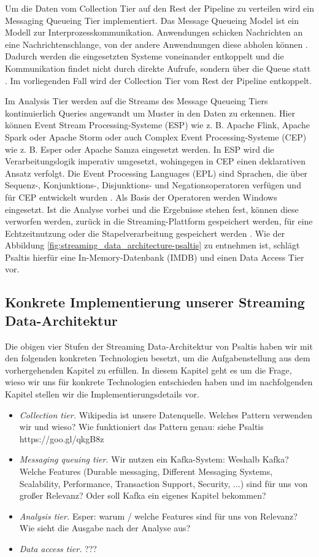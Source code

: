 Um die Daten vom Collection Tier auf den Rest der Pipeline zu verteilen wird ein Messaging Queueing Tier implementiert.
Das Message Queueing Model ist ein Modell zur Interprozesskommunikation. Anwendungen schicken
Nachrichten an eine Nachrichtenschlange, von der andere Anwendnungen diese abholen können \cite{gray2003interprocess}.
Dadurch werden die eingesetzten Systeme voneinander entkoppelt und die Kommunikation findet nicht durch direkte Aufrufe,
sondern über die Queue statt \cite{psaltis2017streaming}. Im vorliegenden Fall wird der Collection Tier vom Rest der Pipeline entkoppelt.

Im Analysis Tier werden auf die Streams des Message Queueing Tiers kontinuierlich Queries angewandt um Muster in den Daten zu erkennen.
Hier können Event Stream Processing-Systeme (ESP) wie z. B. Apache Flink, Apache Spark oder Apache Storm oder
auch Complex Event Processing-Systeme (CEP) wie z. B. Esper oder Apache Samza eingesetzt werden. \cite{psaltis2017streaming}
In ESP wird die Verarbeitungslogik imperativ umgesetzt, wohingegen in CEP einen deklarativen Ansatz verfolgt.
Die Event Processing Languages (EPL) sind Sprachen, die über Sequenz-, Konjunktions-, Disjunktions- und Negationsoperatoren
verfügen und für CEP entwickelt wurden \cite{hedtstck2017complex}. Als Basis der Operatoren werden Windows eingesetzt.
Ist die Analyse vorbei und die Ergebnisse stehen fest, können diese verworfen werden, zurück in die Streaming-Plattform gespeichert werden,
für eine Echtzeitnutzung oder die Stapelverarbeitung gespeichert werden \cite{psaltis2017streaming}. Wie der Abbildung \ref{fig:streaming_data_architecture-psaltis}
zu entnehmen ist, schlägt Psaltis hierfür eine In-Memory-Datenbank (IMDB) und einen Data Access Tier vor.

\subsection{Konkrete Implementierung unserer Streaming Data-Architektur}
Die obigen vier Stufen der Streaming Data-Architektur von Psaltis \cite{psaltis2017streaming}
haben wir mit den folgenden konkreten Technologien besetzt, um die Aufgabenstellung aus dem vorhergehenden Kapitel zu erfüllen.
In diesem Kapitel geht es um die Frage, wieso wir uns für konkrete Technologien entschieden haben und im nachfolgenden Kapitel
stellen wir die Implementierungsdetails vor.
\begin{itemize}
    \item \textit{Collection tier.} Wikipedia ist unsere Datenquelle.
    Welches Pattern verwenden wir und wieso? Wie funktioniert das Pattern genau: siehe Psaltis https://goo.gl/qkgB8z
    \item \textit{Messaging queuing tier.} Wir nutzen ein Kafka-System: Weshalb Kafka? Welche Features
    (Durable messaging, Different Messaging Systems, Scalability, Performance, Transaction Support, Security, ...) sind für uns von großer Relevanz?
    Oder soll Kafka ein eigenes Kapitel bekommen?
    \item \textit{Analysis tier.} Esper: warum / welche Features sind für uns von Relevanz? Wie sieht die Ausgabe nach der Analyse aus?
    \item \textit{Data access tier.} ???
\end{itemize}